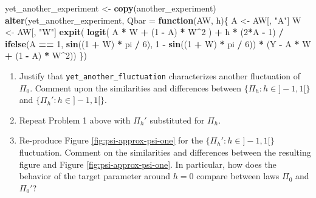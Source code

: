 \documentclass[11pt,openright,twoside]{book}
\newenvironment{Shaded}{\begin{snugshade}}{\end{snugshade}}
\newcommand{\ControlFlowTok}[1]{\textcolor[rgb]{0.13,0.29,0.53}{\textbf{#1}}}
\newcommand{\DataTypeTok}[1]{\textcolor[rgb]{0.13,0.29,0.53}{#1}}
\newcommand{\DecValTok}[1]{\textcolor[rgb]{0.00,0.00,0.81}{#1}}
\newcommand{\KeywordTok}[1]{\textcolor[rgb]{0.13,0.29,0.53}{\textbf{#1}}}
\newcommand{\NormalTok}[1]{#1}
\newcommand{\OperatorTok}[1]{\textcolor[rgb]{0.81,0.36,0.00}{\textbf{#1}}}
\newcommand{\StringTok}[1]{\textcolor[rgb]{0.31,0.60,0.02}{#1}}
\theoremstyle{definition}
\theoremstyle{definition}
\theoremstyle{definition}
\theoremstyle{remark}
\begin{document}
\begin{Shaded}
\begin{Highlighting}[]
\NormalTok{yet_another_experiment <-}\StringTok{ }\KeywordTok{copy}\NormalTok{(another_experiment)}
\KeywordTok{alter}\NormalTok{(yet_another_experiment,}
      \DataTypeTok{Qbar =} \ControlFlowTok{function}\NormalTok{(AW, h)\{}
\NormalTok{        A <-}\StringTok{ }\NormalTok{AW[, }\StringTok{"A"}\NormalTok{]}
\NormalTok{        W <-}\StringTok{ }\NormalTok{AW[, }\StringTok{"W"}\NormalTok{]}
        \KeywordTok{expit}\NormalTok{( }\KeywordTok{logit}\NormalTok{( A }\OperatorTok{*}\StringTok{ }\NormalTok{W }\OperatorTok{+}\StringTok{ }\NormalTok{(}\DecValTok{1} \OperatorTok{-}\StringTok{ }\NormalTok{A) }\OperatorTok{*}\StringTok{ }\NormalTok{W}\OperatorTok{^}\DecValTok{2}\NormalTok{ ) }\OperatorTok{+}\StringTok{ }
\StringTok{               }\NormalTok{h }\OperatorTok{*}\StringTok{ }\NormalTok{(}\DecValTok{2}\OperatorTok{*}\NormalTok{A }\OperatorTok{-}\StringTok{ }\DecValTok{1}\NormalTok{) }\OperatorTok{/}\StringTok{ }\KeywordTok{ifelse}\NormalTok{(A }\OperatorTok{==}\StringTok{ }\DecValTok{1}\NormalTok{,}
                                      \KeywordTok{sin}\NormalTok{((}\DecValTok{1} \OperatorTok{+}\StringTok{ }\NormalTok{W) }\OperatorTok{*}\StringTok{ }\NormalTok{pi }\OperatorTok{/}\StringTok{ }\DecValTok{6}\NormalTok{), }
                                      \DecValTok{1} \OperatorTok{-}\StringTok{ }\KeywordTok{sin}\NormalTok{((}\DecValTok{1} \OperatorTok{+}\StringTok{ }\NormalTok{W) }\OperatorTok{*}\StringTok{ }\NormalTok{pi }\OperatorTok{/}\StringTok{ }\DecValTok{6}\NormalTok{)) }\OperatorTok{*}
\StringTok{               }\NormalTok{(Y }\OperatorTok{-}\StringTok{ }\NormalTok{A }\OperatorTok{*}\StringTok{ }\NormalTok{W }\OperatorTok{+}\StringTok{ }\NormalTok{(}\DecValTok{1} \OperatorTok{-}\StringTok{ }\NormalTok{A) }\OperatorTok{*}\StringTok{ }\NormalTok{W}\OperatorTok{^}\DecValTok{2}\NormalTok{))}
\NormalTok{      \})}
\end{Highlighting}
\end{Shaded}

\begin{enumerate}
\def\labelenumi{\arabic{enumi}.}
\setcounter{enumi}{2}
\item
  Justify that \texttt{yet\_another\_fluctuation} characterizes another fluctuation of
  \(\Pi_{0}\). Comment upon the similarities and differences between \(\{\Pi_{h} : h \in ]-1,1[\}\) and \(\{\Pi_{h}' : h \in ]-1,1[\}\).
\item
  Repeat Problem 1 above with \(\Pi_{h}'\) substituted for \(\Pi_{h}\).
\item
  Re-produce Figure \ref{fig:psi-approx-psi-one} for the \(\{\Pi_h' : h \in ]-1,1[\}\) fluctuation. Comment on the similarities and differences between
  the resulting figure and Figure \ref{fig:psi-approx-psi-one}. In particular,
  how does the behavior of the target parameter around \(h = 0\) compare between
  laws \(\Pi_0\) and \(\Pi_0'\)?
\end{enumerate}
\end{document}
